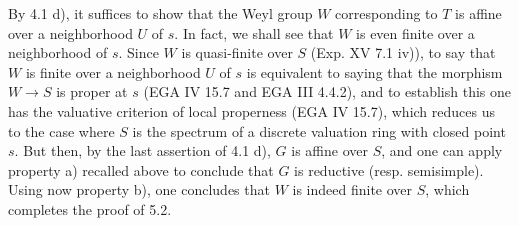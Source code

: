 By 4.1 d), it suffices to show that the Weyl group $W$ corresponding to $T$ is affine over a neighborhood $U$ of $s$. In fact, we shall see that $W$ is even finite over a neighborhood of $s$. Since $W$ is quasi-finite over $S$ (Exp. XV 7.1 iv)), to say that $W$ is finite over a neighborhood $U$ of $s$ is equivalent to saying that the morphism $W\to S$ is proper at $s$ (EGA IV 15.7 and EGA III 4.4.2), and to establish this one has the valuative criterion of local properness (EGA IV 15.7), which reduces us to the case where $S$ is the spectrum of a discrete valuation ring with closed point $s$. But then, by the last assertion of 4.1 d), $G$ is affine over $S$, and one can apply property a) recalled above to conclude that $G$ is reductive (resp. semisimple). Using now property b), one concludes that $W$ is indeed finite over $S$, which completes the proof of 5.2.

